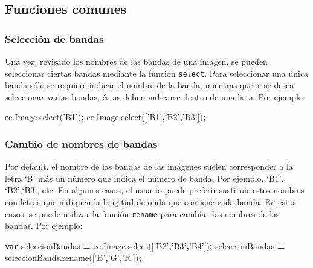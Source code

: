 \documentclass[
]{article}
\newenvironment{Shaded}{\begin{snugshade}}{\end{snugshade}}
\newcommand{\AttributeTok}[1]{\textcolor[rgb]{0.77,0.63,0.00}{#1}}
\newcommand{\KeywordTok}[1]{\textcolor[rgb]{0.13,0.29,0.53}{\textbf{#1}}}
\newcommand{\NormalTok}[1]{#1}
\newcommand{\OperatorTok}[1]{\textcolor[rgb]{0.81,0.36,0.00}{\textbf{#1}}}
\newcommand{\StringTok}[1]{\textcolor[rgb]{0.31,0.60,0.02}{#1}}
\newcommand{\VariableTok}[1]{\textcolor[rgb]{0.00,0.00,0.00}{#1}}
\begin{document}
\hypertarget{funciones-comunes}{%
\subsection{Funciones comunes}\label{funciones-comunes}}

\hypertarget{selecciuxf3n-de-bandas}{%
\subsubsection{Selección de bandas}\label{selecciuxf3n-de-bandas}}

Una vez, revisado los nombres de las bandas de una imagen, se pueden
seleccionar ciertas bandas mediante la función \texttt{select}. Para
seleccionar una única banda sólo se requiere indicar el nombre de la
banda, mientras que si se desea seleccionar varias bandas, éstas deben
indicarse dentro de una lista. Por ejemplo:

\begin{Shaded}
\begin{Highlighting}[]
\VariableTok{ee}\NormalTok{.}\VariableTok{Image}\NormalTok{.}\AttributeTok{select}\NormalTok{(}\StringTok{'B1'}\NormalTok{)}\OperatorTok{;}
\VariableTok{ee}\NormalTok{.}\VariableTok{Image}\NormalTok{.}\AttributeTok{select}\NormalTok{([}\StringTok{'B1'}\OperatorTok{,}\StringTok{'B2'}\OperatorTok{,}\StringTok{'B3'}\NormalTok{])}\OperatorTok{;}
\end{Highlighting}
\end{Shaded}

\hypertarget{cambio-de-nombres-de-bandas}{%
\subsubsection{Cambio de nombres de
bandas}\label{cambio-de-nombres-de-bandas}}

Por default, el nombre de las bandas de las imágenes suelen corresponder
a la letra `B' más un número que indica el número de banda. Por ejemplo,
`B1', `B2',`B3', etc. En algunos casos, el usuario puede preferir
sustituir estos nombres con letras que indiquen la longitud de onda que
contiene cada banda. En estos casos, se puede utilizar la función
\texttt{rename} para cambiar los nombres de las bandas. Por ejemplo:

\begin{Shaded}
\begin{Highlighting}[]
\KeywordTok{var}\NormalTok{ seleccionBandas }\OperatorTok{=} \VariableTok{ee}\NormalTok{.}\VariableTok{Image}\NormalTok{.}\AttributeTok{select}\NormalTok{([}\StringTok{'B2'}\OperatorTok{,}\StringTok{'B3'}\OperatorTok{,}\StringTok{'B4'}\NormalTok{])}\OperatorTok{;}
\NormalTok{seleccionBandas }\OperatorTok{=} \VariableTok{seleccionBands}\NormalTok{.}\AttributeTok{rename}\NormalTok{([}\StringTok{'B'}\OperatorTok{,}\StringTok{'G'}\OperatorTok{,}\StringTok{'R'}\NormalTok{])}\OperatorTok{;}
\end{Highlighting}
\end{Shaded}
\end{document}
